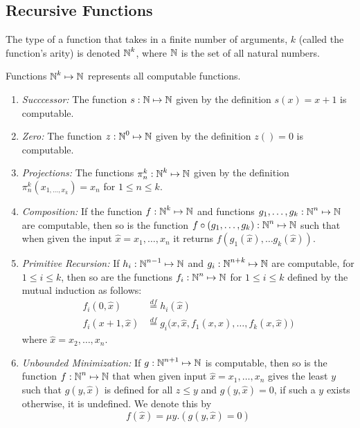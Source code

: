 \subsection{Recursive Functions}\label{subsec:Recursive_Functions}
The type of a function that takes in a finite number of arguments, $k$ (called the function's arity) is denoted $\operatorname{\mathbb{N}}^{k}$, where $\operatorname{\mathbb{N}}$ is the set of all natural numbers.

Functions $\operatorname{\mathbb{N}}^{k} \mapsto \operatorname{\mathbb{N}}$ represents all computable functions.
\begin{enumerate}[noitemsep]
\item \emph{Succcessor:} The function $s : \operatorname{\mathbb{N}} \mapsto \operatorname{\mathbb{N}}$ given by the definition $s(x) = x + 1$ is computable.
\item \emph{Zero:} The function $z : \operatorname{\mathbb{N}}^{0} \mapsto \operatorname{\mathbb{N}}$ given by the definition $z() = 0$ is computable.
\item \emph{Projections:} The functions $\pi_{n}^{k} : \operatorname{\mathbb{N}}^{k} \mapsto \operatorname{\mathbb{N}}$ given by the definition $\pi_{n}^{k}(x_{1, \ldots, x_{k}}) = x_{n}$ for $1 \leq n \leq k$.
\item \emph{Composition:} If the function $f : \operatorname{\mathbb{N}}^{k} \mapsto \operatorname{\mathbb{N}}$ and functions $g_{1}, \ldots, g_{k} : \operatorname{\mathbb{N}}^{n} \mapsto \operatorname{\mathbb{N}}$ are computable, then so is the function $f \circ (g_{1}, \ldots, g_{k}) : \operatorname{\mathbb{N}}^{n} \mapsto \operatorname{\mathbb{N}}$ such that when given the input $\hat{x} = x_{1}, \ldots, x_{n}$ it returns $f(g_{1}(\hat{x}), \ldots g_{k}(\hat{x}))$.
\item \emph{Primitive Recursion:} If $h_{i} : \operatorname{\mathbb{N}}^{n-1} \mapsto \operatorname{\mathbb{N}}$ and $g_{i} : \operatorname{\mathbb{N}}^{n+k} \mapsto \operatorname{\mathbb{N}}$ are computable, for $1 \leq i \leq k$, then so are the functions $f_{i} : \operatorname{\mathbb{N}}^{n} \mapsto \operatorname{\mathbb{N}}$ for $1 \leq i \leq k$ defined by the mutual induction as follows:
  \begin{align*}
    f_{i}(0, \hat{x}) &\overset{df}{=} h_{i}(\hat{x}) \\
    f_{i}(x+1, \hat{x}) &\overset{df}{=} g_{i} \bigl( x, \hat{x}, f_{1}(x, \hat{x}), \ldots, f_{k}(x, \hat{x}) \bigr)
  \end{align*}
  where $\hat{x} = x_{2}, \ldots, x_{n}$.
\item \emph{Unbounded Minimization:} If $g : \operatorname{\mathbb{N}}^{n+1} \mapsto \operatorname{\mathbb{N}}$ is computable, then so is the function $f : \operatorname{\mathbb{N}}^{n} \mapsto \operatorname{\mathbb{N}}$ that when given input $\hat{x} = x_{1}, \ldots, x_{n}$ gives the least $y$ such that $g(y, \hat{x})$ is defined for all $z \leq y$ and $g(y, \hat{x}) = 0$, if such a $y$ exists otherwise, it is undefined.
  We denote this by
  \begin{equation*}
    f(\hat{x}) = \mu y. (g (y, \hat{x}) = 0)
  \end{equation*}
\end{enumerate}

